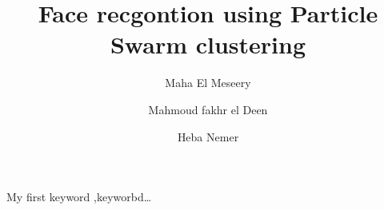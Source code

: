 \begin{frontmatter}


\title {Face recgontion using Particle Swarm clustering  }


\author[label]{Maha El Meseery}
\author[label]{Mahmoud fakhr el Deen}
\author[label]{Heba Nemer}

\address[label]{Electronic Research Institute, Cairo, Egypt}





\begin{keyword}
My first keyword \sep keyworbd\ldots

\end{keyword}

\end{frontmatter}
